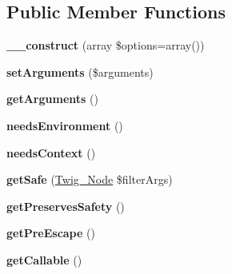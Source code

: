 \subsection*{Public Member Functions}
\begin{DoxyCompactItemize}
\item 
{\bfseries \+\_\+\+\_\+construct} (array \$options=array())\hypertarget{classTwig__Filter_a8d6eeda2fa399297559f5c6cd3fc6e52}{}\label{classTwig__Filter_a8d6eeda2fa399297559f5c6cd3fc6e52}

\item 
{\bfseries set\+Arguments} (\$arguments)\hypertarget{classTwig__Filter_a57e79ecd5b4c7844c8f4af5179e0efda}{}\label{classTwig__Filter_a57e79ecd5b4c7844c8f4af5179e0efda}

\item 
{\bfseries get\+Arguments} ()\hypertarget{classTwig__Filter_a1b53b346b96b5d85cbc3cf13e07af04c}{}\label{classTwig__Filter_a1b53b346b96b5d85cbc3cf13e07af04c}

\item 
{\bfseries needs\+Environment} ()\hypertarget{classTwig__Filter_af37d7c6e8e4279c2e889a7f4b4246f93}{}\label{classTwig__Filter_af37d7c6e8e4279c2e889a7f4b4246f93}

\item 
{\bfseries needs\+Context} ()\hypertarget{classTwig__Filter_a3bbfe7680166b2e73f2c69b2ddfd5558}{}\label{classTwig__Filter_a3bbfe7680166b2e73f2c69b2ddfd5558}

\item 
{\bfseries get\+Safe} (\hyperlink{classTwig__Node}{Twig\+\_\+\+Node} \$filter\+Args)\hypertarget{classTwig__Filter_aeec19de92445871942075e5210f8cfab}{}\label{classTwig__Filter_aeec19de92445871942075e5210f8cfab}

\item 
{\bfseries get\+Preserves\+Safety} ()\hypertarget{classTwig__Filter_a5d4132baeb59dba05de6227b65455ef6}{}\label{classTwig__Filter_a5d4132baeb59dba05de6227b65455ef6}

\item 
{\bfseries get\+Pre\+Escape} ()\hypertarget{classTwig__Filter_a276d453bf1020fffc69184905e31b5da}{}\label{classTwig__Filter_a276d453bf1020fffc69184905e31b5da}

\item 
{\bfseries get\+Callable} ()\hypertarget{classTwig__Filter_a523c83dd1536dbc0f6b179a0111a659b}{}\label{classTwig__Filter_a523c83dd1536dbc0f6b179a0111a659b}

\end{DoxyCompactItemize}
